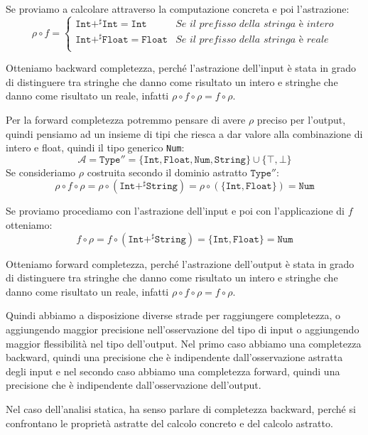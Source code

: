 Se proviamo a calcolare attraverso la computazione concreta e poi l'astrazione:
\[
    \rho \circ f = 
    \begin{cases}
        \texttt{Int} +^\sharp \texttt{Int} = \texttt{Int}  & \textit{Se il prefisso della stringa è intero}\\
        \texttt{Int} +^\sharp \texttt{Float} = \texttt{Float} & \textit{Se il prefisso della stringa è reale}\\
    \end{cases}
\]

Otteniamo backward completezza, perché l'astrazione dell'input è stata in grado di distinguere
tra stringhe che danno come risultato un intero e stringhe che danno come risultato un reale, 
infatti $\rho \circ f \circ \rho = f \circ \rho$.

Per la forward completezza potremmo pensare di avere $\rho$ preciso per l'output, quindi 
pensiamo ad un insieme di tipi che riesca a dar valore alla combinazione di intero e float, quindi 
il tipo generico \texttt{Num}:
\[
    \mathcal{A} = \texttt{Type}'' = \{\texttt{Int}, \texttt{Float}, \texttt{Num},
    \texttt{String}\} \cup \{\top, \bot\}
\]
Se consideriamo $\rho$ costruita secondo il dominio astratto $\texttt{Type}''$:
\[
    \rho \circ f \circ \rho = 
    \rho \circ (\texttt{Int} +^\sharp \texttt{String}) =
    \rho \circ (\{ \texttt{Int}, \texttt{Float} \})
    = \texttt{Num}
\]

Se proviamo procediamo con l'astrazione dell'input e poi con l'applicazione di $f$ otteniamo:
\[
    f \circ \rho = f \circ (\texttt{Int} +^\sharp \texttt{String}) =
    \{ \texttt{Int}, \texttt{Float} \} = \texttt{Num}
\]

Otteniamo forward completezza, perché l'astrazione dell'output è
stata in grado di distinguere tra stringhe che danno come risultato un intero e stringhe che
danno come risultato un reale, infatti $\rho \circ f \circ \rho = f \circ \rho$.

\begin{tcolorbox}[title =Raggiungimento di completezza]
    Quindi abbiamo a disposizione diverse strade per raggiungere completezza, o aggiungendo 
    maggior precisione nell'osservazione del tipo di input o aggiungendo maggior flessibilità 
    nel tipo dell'output. Nel primo caso abbiamo una completezza backward, quindi una precisione 
    che è indipendente dall'osservazione astratta degli input e nel secondo caso abbiamo una
    completezza forward, quindi una precisione che è indipendente dall'osservazione dell'output.
\end{tcolorbox}
Nel caso dell'analisi statica, ha senso parlare di completezza backward, perché 
si confrontano le proprietà astratte del calcolo concreto e del calcolo astratto.

